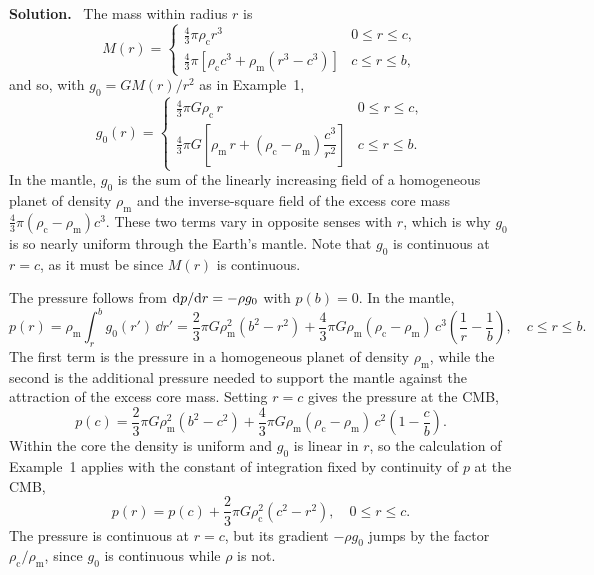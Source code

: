 \documentclass[a4paper,12pt]{paper}
\newenvironment{solution}{\par\noindent\textbf{Solution.}\ }{\par\medskip}
\begin{document}
\begin{solution}
The mass within radius $r$ is
\begin{equation}
M(r)=\begin{cases}\frac{4}{3}\pi\rho_{\mathrm{c}}r^{3} & 0\le r\le c,\\[4pt]
\frac{4}{3}\pi\left[\rho_{\mathrm{c}}c^{3}+\rho_{\mathrm{m}}(r^{3}-c^{3})\right] & c\le r\le b,\end{cases}
\label{eq:7}
\end{equation}
and so, with $g_{0}=GM(r)/r^{2}$ as in Example~1,
\begin{equation}
g_{0}(r)=\begin{cases}\frac{4}{3}\pi G\rho_{\mathrm{c}}\,r & 0\le r\le c,\\[4pt]
\frac{4}{3}\pi G\left[\rho_{\mathrm{m}}\,r+(\rho_{\mathrm{c}}-\rho_{\mathrm{m}})\dfrac{c^{3}}{r^{2}}\right] & c\le r\le b.\end{cases}
\label{eq:8}
\end{equation}
In the mantle, $g_{0}$ is the sum of the linearly increasing field of a homogeneous planet of density
$\rho_{\mathrm{m}}$ and the inverse-square field of the excess core mass
$\frac{4}{3}\pi(\rho_{\mathrm{c}}-\rho_{\mathrm{m}})c^{3}$. These two terms vary in opposite senses with $r$,
which is why $g_{0}$ is so nearly uniform through the Earth's mantle. Note that $g_{0}$ is
continuous at $r=c$, as it must be since $M(r)$ is continuous.

The pressure follows from $\mathrm{d} p/\mathrm{d} r=-\rho g_{0}$ with $p(b)=0$. In the mantle,
\begin{equation}
p(r)=\rho_{\mathrm{m}}\int_{r}^{b}g_{0}(r')\,\dd r'
=\frac{2}{3}\pi G\rho_{\mathrm{m}}^{2}(b^{2}-r^{2})+\frac{4}{3}\pi G\rho_{\mathrm{m}}(\rho_{\mathrm{c}}-\rho_{\mathrm{m}})\,c^{3}\left(\frac{1}{r}-\frac{1}{b}\right),
\quad c\le r\le b.
\label{eq:9}
\end{equation}
The first term is the pressure in a homogeneous planet of density $\rho_{\mathrm{m}}$, while the
second is the additional pressure needed to support the mantle against the attraction of the excess
core mass. Setting $r=c$ gives the pressure at the CMB,
\begin{equation}
p(c)=\frac{2}{3}\pi G\rho_{\mathrm{m}}^{2}(b^{2}-c^{2})+\frac{4}{3}\pi G\rho_{\mathrm{m}}(\rho_{\mathrm{c}}-\rho_{\mathrm{m}})\,c^{2}\left(1-\frac{c}{b}\right).
\label{eq:10}
\end{equation}
Within the core the density is uniform and $g_{0}$ is linear in $r$, so the calculation of
Example~1 applies with the constant of integration fixed by continuity of $p$ at the CMB,
\begin{equation}
p(r)=p(c)+\frac{2}{3}\pi G\rho_{\mathrm{c}}^{2}(c^{2}-r^{2}),\quad 0\le r\le c.
\label{eq:11}
\end{equation}
The pressure is continuous at $r=c$, but its gradient $-\rho g_{0}$ jumps by the factor
$\rho_{\mathrm{c}}/\rho_{\mathrm{m}}$, since $g_{0}$ is continuous while $\rho$ is not.


\end{solution}
\end{document}
